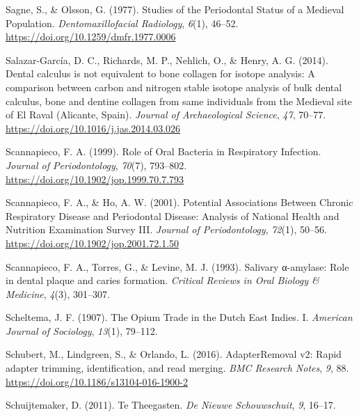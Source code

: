 \documentclass[
  letterpaper,
]{book}
\newlength{\cslhangindent}
\newlength{\cslentryspacingunit} %
\newenvironment{CSLReferences}[2] %
 {%
  \setlength{\parindent}{0pt}
  \ifodd #1
  \let\oldpar\par
  \def\par{\hangindent=\cslhangindent\oldpar}
  \fi
  \setlength{\parskip}{#2\cslentryspacingunit}
 }%
 {}
\begin{document}
\begin{CSLReferences}{1}{0}
\leavevmode{}%
Sagne, S., \& Olsson, G. (1977). Studies of the {Periodontal Status} of
a {Medieval Population}. \emph{Dentomaxillofacial Radiology},
\emph{6}(1), 46--52. \url{https://doi.org/10.1259/dmfr.1977.0006}

\leavevmode{}%
Salazar-García, D. C., Richards, M. P., Nehlich, O., \& Henry, A. G.
(2014). Dental calculus is not equivalent to bone collagen for isotope
analysis: A comparison between carbon and nitrogen stable isotope
analysis of bulk dental calculus, bone and dentine collagen from same
individuals from the {Medieval} site of {El Raval} ({Alicante},
{Spain}). \emph{Journal of Archaeological Science}, \emph{47}, 70--77.
\url{https://doi.org/10.1016/j.jas.2014.03.026}

\leavevmode{}%
Scannapieco, F. A. (1999). Role of {Oral Bacteria} in {Respiratory
Infection}. \emph{Journal of Periodontology}, \emph{70}(7), 793--802.
\url{https://doi.org/10.1902/jop.1999.70.7.793}

\leavevmode{}%
Scannapieco, F. A., \& Ho, A. W. (2001). Potential {Associations Between
Chronic Respiratory Disease} and {Periodontal Disease}: {Analysis} of
{National Health} and {Nutrition Examination Survey III}. \emph{Journal
of Periodontology}, \emph{72}(1), 50--56.
\url{https://doi.org/10.1902/jop.2001.72.1.50}

\leavevmode{}%
Scannapieco, F. A., Torres, G., \& Levine, M. J. (1993). Salivary
α-amylase: Role in dental plaque and caries formation. \emph{Critical
Reviews in Oral Biology \& Medicine}, \emph{4}(3), 301--307.

\leavevmode{}%
Scheltema, J. F. (1907). The {Opium Trade} in the {Dutch East Indies}.
{I}. \emph{American Journal of Sociology}, \emph{13}(1), 79--112.

\leavevmode{}%
Schubert, M., Lindgreen, S., \& Orlando, L. (2016). {AdapterRemoval} v2:
Rapid adapter trimming, identification, and read merging. \emph{BMC
Research Notes}, \emph{9}, 88.
\url{https://doi.org/10.1186/s13104-016-1900-2}

\leavevmode{}%
Schuijtemaker, D. (2011). Te Theegasten. \emph{De Nieuwe Schouwschuit},
\emph{9}, 16--17.


\end{CSLReferences}
\end{document}
